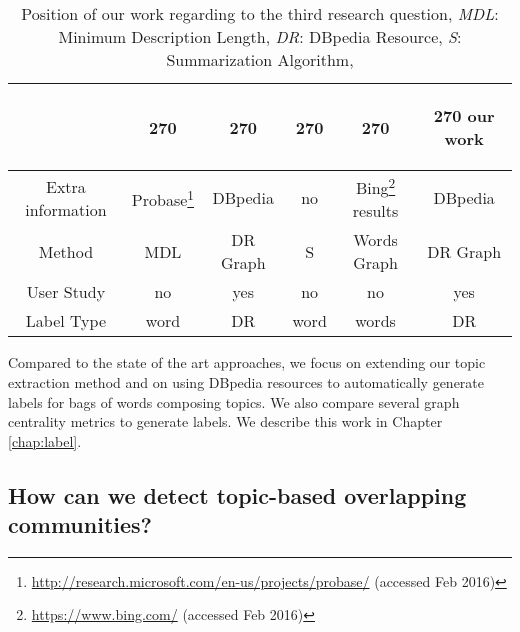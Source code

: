    \begin{table}[htp]
        \centering
        \begin{tabular}{c c c c c c}
        &
        \begin{turn}{270}
            \cite{chp6OnConceptualLabelingOfBagOfWords} 
        \end{turn} 
        &
        \begin{turn}{270} 
            \cite{chp2hulpus2013unsupervisedtopiclabeling} 
        \end{turn}
        &
        \begin{turn}{270} 
            \cite{chp2cano2014automatictopiclabeling}
        \end{turn}
        &
        \begin{turn}{270}
            \cite{chp2aletras2014labelling}
        \end{turn}
        &
        \begin{turn}{270}
        our work
        \end{turn}
        \\ \hline
        Extra information& Probase\footnote{\url{http://research.microsoft.com/en-us/projects/probase/} (accessed Feb 2016)} & DBpedia & no  & Bing\footnote{\url{https://www.bing.com/} (accessed Feb 2016)} results & DBpedia \\ \hline
        Method & MDL & DR Graph &S& Words Graph & DR Graph   \\ \hline
        User Study & no & yes & no & no&  yes \\ \hline
        Label Type & word & DR & word & words & DR \\ \hline
        
        \end{tabular}
        \caption{Position of our work regarding to the third research question, \textit{MDL}: Minimum Description Length, \textit{DR}: DBpedia Resource, \textit{S}: Summarization Algorithm,  }
    
        \label{tab:rq3compare}
    \end{table}
Compared to the state of the art approaches, we focus on extending our topic extraction method and on using DBpedia resources to automatically generate labels for bags of words composing topics. We also compare several graph centrality metrics to generate labels. We describe this work in Chapter \ref{chap:label}.
    
    
\subsection{How can we detect topic-based overlapping communities?}

